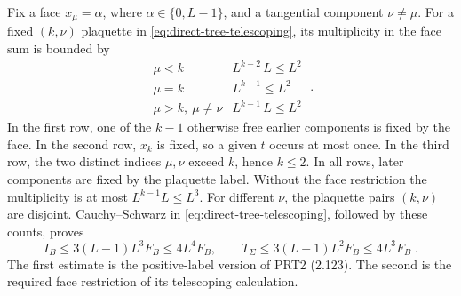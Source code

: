 \documentclass[11pt]{article}
\begin{document}
Fix a face $x_\mu=\alpha$, where $\alpha\in \{0,L-1\}$, and a tangential component $\nu\ne \mu$. For a fixed $(k,\nu)$ plaquette in \eqref{eq:direct-tree-telescoping}, its multiplicity in the face sum is bounded by
\begin{equation}\label{eq:direct-face-multiplicities}
    \begin{array}{c|c}
        \mu<k & L^{k-2}\,L\leq L^2\\
        \mu=k & L^{k-1}\leq L^2\\
        \mu>k,\ \mu\ne \nu & L^{k-1}\,L\leq L^2
    \end{array}\;.
\end{equation}
In the first row, one of the $k-1$ otherwise free earlier components is fixed by the face. In the second row, $x_k$ is fixed, so a given $t$ occurs at most once. In the third row, the two distinct indices $\mu,\nu$ exceed $k$, hence $k\leq 2$. In all rows, later components are fixed by the plaquette label. Without the face restriction the multiplicity is at most $L^{k-1}L\leq L^3$. For different $\nu$, the plaquette pairs $(k,\nu)$ are disjoint. Cauchy--Schwarz in \eqref{eq:direct-tree-telescoping}, followed by these counts, proves
\begin{equation}\label{eq:direct-block-face-bound}
    I_B\leq 3(L-1)L^3F_B\leq 4L^4F_B,
    \qquad
    T_\Sigma\leq 3(L-1)L^2F_B\leq 4L^3F_B\;.
\end{equation}
The first estimate is the positive-label version of PRT2 (2.123). The second is the required face restriction of its telescoping calculation.
\end{document}
